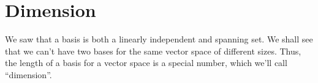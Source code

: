 \section{Dimension}
We saw that a basis is both a linearly independent and spanning set.
We shall see that we can't have two bases for the same vector space of different sizes.
Thus, the length of a basis for a vector space is a special number, which we'll call ``dimension''.



